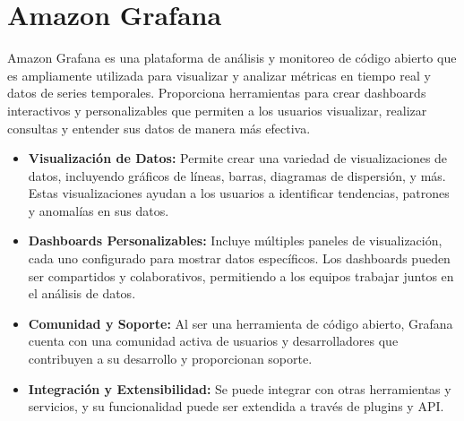 \section{Amazon Grafana}
Amazon Grafana \cite{E_Twahirwa} \cite{knuth} \cite{A_Abd} \cite{A_Evelyn}\cite{A_Rana}\cite{A_Simo}\cite{D_Fermin}\cite{D_Ochoa}\cite{G_Jota}\cite{H_Paz}\cite{H_Siachoque}\cite{LJ_Chen}\cite{M_Rodenas}\cite{OMS}\cite{Y_Simmhan} es una plataforma de análisis y monitoreo de código abierto que es ampliamente utilizada para visualizar y analizar métricas en tiempo real y datos de series temporales. Proporciona herramientas para crear dashboards interactivos y personalizables que permiten a los usuarios visualizar, realizar consultas y entender sus datos de manera más efectiva.
\begin{itemize}
     \item \textbf{Visualización de Datos:} Permite crear una variedad de visualizaciones de datos, incluyendo gráficos de líneas, barras, diagramas de dispersión, y más. Estas visualizaciones ayudan a los usuarios a identificar tendencias, patrones y anomalías en sus datos.
    \item \textbf{Dashboards Personalizables:} Incluye múltiples paneles de visualización, cada uno configurado para mostrar datos específicos. Los dashboards pueden ser compartidos y colaborativos, permitiendo a los equipos trabajar juntos en el análisis de datos.
    \item \textbf{Comunidad y Soporte:} Al ser una herramienta de código abierto, Grafana cuenta con una comunidad activa de usuarios y desarrolladores que contribuyen a su desarrollo y proporcionan soporte.
    \item \textbf{Integración y Extensibilidad:} Se puede integrar con otras herramientas y servicios, y su funcionalidad puede ser extendida a través de plugins y API.
   
\end{itemize}




